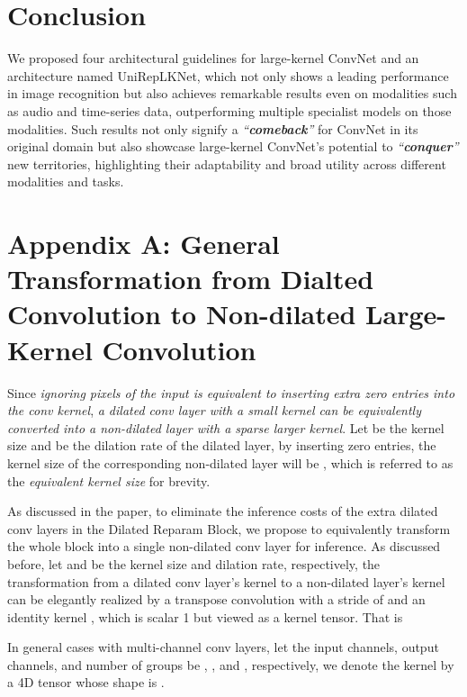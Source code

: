 \documentclass[10pt,twocolumn,letterpaper]{article}
\begin{document}
 \section{Conclusion}
We proposed four architectural guidelines for large-kernel ConvNet and an architecture named UniRepLKNet, which not only shows a leading performance in image recognition but also achieves remarkable results even on modalities such as audio and time-series data, outperforming multiple specialist models on those modalities. Such results not only signify a \emph{``\textbf{comeback}''} for ConvNet in its original domain but also showcase large-kernel ConvNet's potential to \emph{``\textbf{conquer}''} new territories, highlighting their adaptability and broad utility across different modalities and tasks. 
{
    \small
    
    
}

\newpage



\clearpage
\setcounter{page}{1}
\maketitlesupplementary


\section*{Appendix A: General Transformation from Dialted Convolution to Non-dilated Large-Kernel Convolution}

Since \emph{ignoring pixels of the input is equivalent to inserting extra zero entries into the conv kernel}, \emph{a dilated conv layer with a small kernel can be equivalently converted into a non-dilated layer with a sparse larger kernel}. Let  be the kernel size and  be the dilation rate of the dilated layer, by inserting zero entries, the kernel size of the corresponding non-dilated layer will be , which is referred to as the \emph{equivalent kernel size} for brevity. 

As discussed in the paper, to eliminate the inference costs of the extra dilated conv layers in the Dilated Reparam Block, we propose to equivalently transform the whole block into a single non-dilated conv layer for inference. As discussed before, let  and  be the kernel size and dilation rate, respectively, the transformation from a dilated conv layer's kernel  to a non-dilated layer's kernel  can be elegantly realized by a transpose convolution with a stride of  and an identity kernel , which is scalar 1 but viewed as a kernel tensor. That is


In general cases with multi-channel conv layers, let the input channels, output channels, and number of groups be , , and , respectively, we denote the kernel by a 4D tensor whose shape is . 
\end{document}
